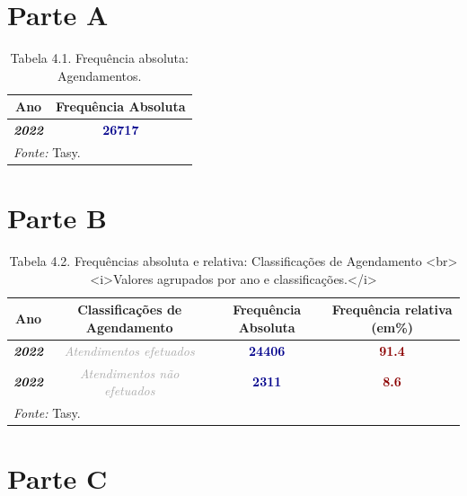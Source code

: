 \documentclass[
  letterpaper,
  DIV=11,
  numbers=noendperiod]{scrreprt}
\begin{document}

\section{Parte A}

\begin{table}
\centering
\caption{Tabela 4.1. Frequência absoluta: Agendamentos.}
\centering
\begin{tabular}[t]{>{}c|>{}c}
\hline
Ano & Frequência Absoluta\\
\hline
\textcolor{black}{\em{\textbf{2022}}} & \textcolor{darkblue}{\textbf{26717}}\\
\hline
\multicolumn{2}{l}{\rule{0pt}{1em}\textit{Fonte: } Tasy.}\\
\end{tabular}
\end{table}

\section{Parte B}

\begin{table}
\centering
\caption{Tabela 4.2. Frequências absoluta e relativa: Classificações de Agendamento  <br><i>Valores agrupados por ano e classificações.</i>}
\centering
\begin{tabular}[t]{>{}c|>{}c|>{}c|>{}c}
\hline
Ano & Classificações de Agendamento & Frequência Absoluta & Frequência relativa (em\%)\\
\hline
\textcolor{black}{\em{\textbf{2022}}} & \textcolor{darkgray}{\em{Atendimentos efetuados}} & \textcolor{darkblue}{\textbf{24406}} & \textcolor{darkred}{\textbf{91.4}}\\
\hline
\textcolor{black}{\em{\textbf{2022}}} & \textcolor{darkgray}{\em{Atendimentos não efetuados}} & \textcolor{darkblue}{\textbf{2311}} & \textcolor{darkred}{\textbf{8.6}}\\
\hline
\multicolumn{4}{l}{\rule{0pt}{1em}\textit{Fonte: } Tasy.}\\
\end{tabular}
\end{table}

\section{Parte C}
\end{document}
